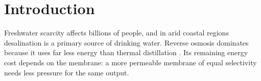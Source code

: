 \chapter{Introduction}
\label{ch:introduction}

Freshwater scarcity affects billions of people, and in arid coastal regions desalination is a
primary source of drinking water. Reverse osmosis dominates because it uses far less energy than
thermal distillation \citep{elimelech2011}. Its remaining energy cost depends on the membrane:
a more permeable membrane of equal selectivity needs less pressure for the same output.
